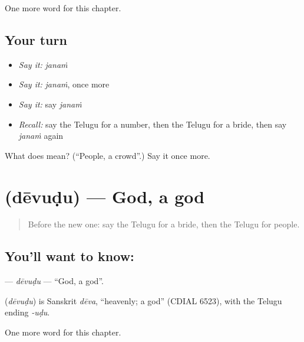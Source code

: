 \begin{grammarlens}[title={What you've built}]
One more word for this chapter.
\end{grammarlens}

\subsection*{Your turn}
\begin{itemize}
\raggedright
  \item \emph{Say it:} \emph{janaṁ}
  \item \emph{Say it:} \emph{janaṁ}, once more
  \item \emph{Say it:} say \emph{janaṁ}
  \item \emph{Recall:} say the Telugu for a number, then the Telugu for a bride, then say \emph{janaṁ} again
\end{itemize}

\begin{tcolorbox}[breakable,colback=teal!4,colframe=teal!35!black,title={Before you move on}]
What does  mean? (\textquotedblleft{}People, a crowd\textquotedblright{}.) Say it once more.
\end{tcolorbox}
\section[\texorpdfstring{\te{దేవుడు} (dēvuḍu)}{దేవుడు (dēvuḍu)}]{ (dēvuḍu) — God, a god}

\label{lesson:TE-C265-devudu}



\begin{quote}
Before the new one: say the Telugu for a bride, then the Telugu for people.
\end{quote}

\subsection*{You'll want to know: }
\textbf{} — \emph{dēvuḍu} — \textquotedblleft{}God, a god\textquotedblright{}.

\begin{cousinweb}
\textbf{} (\emph{dēvuḍu}) is Sanskrit \emph{dēva}, \textquotedblleft{}heavenly; a god\textquotedblright{} (CDIAL 6523), with the Telugu ending \emph{-uḍu}.
\end{cousinweb}

\begin{grammarlens}[title={What you've built}]
One more word for this chapter.
\end{grammarlens}

